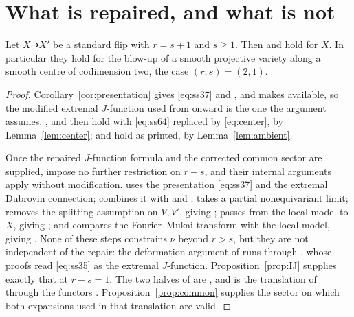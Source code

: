 \section{What is repaired, and what is not}
\label{sec:scope}

\begin{theorem}
  \label{thm:assembled}
  Let \(X\dashrightarrow X'\) be a standard flip with \(r=s+1\) and
  \(s\ge1\).  Then \cite[Theorems~1.2, 1.4, 9.9 and~9.14]{SS} and
  \cite[Corollary~1.5]{SS} hold for \(X\).  In particular they hold for the
  blow-up of a smooth projective variety along a smooth centre of
  codimension two, the case \((r,s)=(2,1)\).
\end{theorem}

\begin{proof}
  Corollary~\ref{cor:presentation} gives \eqref{eq:ss37} and
  \cite[Theorem~1.2]{SS}, and makes \cite[(39)--(40)]{SS} available, so the
  modified extremal \(J\)-function used from \cite[Section~7]{SS} onward is
  the one the argument assumes.  \cite[Proposition~7.5]{SS},
  \cite[Corollary~7.6]{SS} and \cite[Proposition~7.8]{SS} then hold with
  \eqref{eq:ss64} replaced by \eqref{eq:center}, by Lemma~\ref{lem:center};
  \cite[Propositions~8.2 and~8.3]{SS} and \cite[Corollary~8.4]{SS} hold as
  printed, by Lemma~\ref{lem:ambient}.

  Once the repaired \(J\)-function formula and the corrected common sector
  are supplied, \cite[Sections~9.1--9.4]{SS} impose no further restriction on
  \(r-s\), and their internal arguments apply without modification.
  \cite[Proposition~9.1]{SS} uses the presentation \eqref{eq:ss37} and the
  extremal Dubrovin connection; \cite[Proposition~9.2]{SS} combines it with
  \cite[Proposition~7.8]{SS} and \cite[Corollary~8.4]{SS};
  \cite[Corollary~9.3]{SS} takes a
  partial nonequivariant limit; \cite[Section~9.2]{SS} removes the splitting
  assumption on \(V,V'\), giving \cite[Corollary~9.7]{SS};
  \cite[Section~9.3]{SS} passes from the local model to \(X\), giving
  \cite[Theorem~9.9]{SS}; and \cite[Section~9.4]{SS} compares the
  Fourier--Mukai transform with the local model, giving
  \cite[Theorem~9.14]{SS}.  None of these steps constrains \(\nu\) beyond
  \(r>s\), but they are not independent of the repair: the deformation
  argument of \cite[Section~9.2]{SS} runs through \cite[Lemmas~9.4--9.6]{SS},
  whose proofs read \eqref{eq:ss35} as the extremal \(J\)-function.
  Proposition~\ref{prop:IJ} supplies exactly that at \(r-s=1\).
  The two halves of \cite[Theorem~1.4]{SS} are
  \cite[Theorems~9.9 and~9.14]{SS}, and \cite[Corollary~1.5]{SS} is the
  translation of \cite[Theorem~1.4]{SS} through the functors
  \cite[(3)]{SS}.  Proposition~\ref{prop:common} supplies the sector on
  which both expansions used in that translation are valid.
\end{proof}

